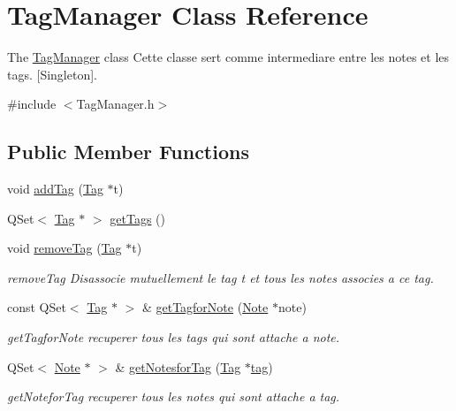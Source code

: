 \hypertarget{class_tag_manager}{\section{Tag\-Manager Class Reference}
\label{class_tag_manager}
}


The \hyperlink{class_tag_manager}{Tag\-Manager} class Cette classe sert comme intermediare entre les notes et les tags. \mbox{[}Singleton\mbox{]}.  




{\ttfamily \#include $<$Tag\-Manager.\-h$>$}

\subsection*{Public Member Functions}
\begin{DoxyCompactItemize}
\item 
void \hyperlink{class_tag_manager_ac672877a5e9fda8398817b437350c35b}{add\-Tag} (\hyperlink{class_tag}{Tag} $\ast$t)
\item 
Q\-Set$<$ \hyperlink{class_tag}{Tag} $\ast$ $>$ \hyperlink{class_tag_manager_a6db221882f6ee6bc22abdb6e1785b344}{get\-Tags} ()
\item 
void \hyperlink{class_tag_manager_aa9236f4afa653ebca603d07849719a63}{remove\-Tag} (\hyperlink{class_tag}{Tag} $\ast$t)
\begin{DoxyCompactList}\small\item\em remove\-Tag Disassocie mutuellement le tag t et tous les notes associes a ce tag. \end{DoxyCompactList}\item 
const Q\-Set$<$ \hyperlink{class_tag}{Tag} $\ast$ $>$ \& \hyperlink{class_tag_manager_a51d43e2a6f57c6bb5bab47aac9d415d0}{get\-Tagfor\-Note} (\hyperlink{class_note}{Note} $\ast$note)
\begin{DoxyCompactList}\small\item\em get\-Tagfor\-Note recuperer tous les tags qui sont attache a note. \end{DoxyCompactList}\item 
Q\-Set$<$ \hyperlink{class_note}{Note} $\ast$ $>$ \& \hyperlink{class_tag_manager_a9cf10a6c96770c5442f2f2ed68b175c9}{get\-Notesfor\-Tag} (\hyperlink{class_tag}{Tag} $\ast$\hyperlink{_filter_8h_a7ef0ab496f57e183b484e62e2053c94fa9daab2aa897c0d2d4500bed734b0d780}{tag})
\begin{DoxyCompactList}\small\item\em get\-Notefor\-Tag recuperer tous les notes qui sont attache a tag. \end{DoxyCompactList}\item 

\end{DoxyCompactItemize}

